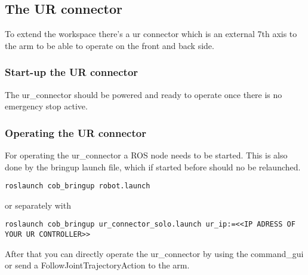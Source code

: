\subsection{The UR connector}
To extend the workspace there's a ur connector which is an external 7th axis to the arm to be able to operate on the front and back side.

\subsubsection{Start-up the UR connector}
The ur\_connector should be powered and ready to operate once there is no emergency stop active.

\subsubsection{Operating the UR connector}
For operating the ur\_connector a ROS node needs to be started. This is also done by the bringup launch file, which if started before should no be relaunched.
\begin{lstlisting}
roslaunch cob_bringup robot.launch
\end{lstlisting}
or separately with 
\begin{lstlisting}
roslaunch cob_bringup ur_connector_solo.launch ur_ip:=<<IP ADRESS OF YOUR UR CONTROLLER>>
\end{lstlisting}
After that you can directly operate the ur\_connector by using the command\_gui or send a FollowJointTrajectoryAction to the arm.
